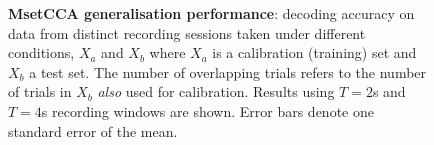 \begin{figure}[!htb]
\hfill
{}
\caption[MsetCCA generalisation performance: test decoding accuracy when calibrating and testing on data collected from distinct sessions under different conditions]{\textbf{MsetCCA generalisation performance}: decoding accuracy on data from distinct recording sessions taken under different conditions, $X_a$ and $X_b$ where $X_a$ is a calibration (training) set and $X_b$ a test set. The number of overlapping trials refers to the number of trials in $X_b$ \textit{also} used for calibration. Results using $T=2$s and $T=4$s recording windows are shown. Error bars denote one standard error of the mean.}
\label{fig:gt-results-mcca}
\end{figure}


